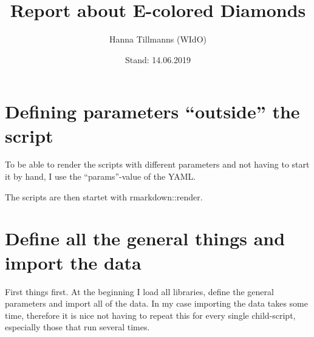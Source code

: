 \documentclass[12pt,]{article}
\title{\vspace{3in}Report about E-colored Diamonds}
\author{Hanna Tillmanns (WIdO)}
\date{Stand: 14.06.2019}
\newenvironment{Shaded}{\begin{snugshade}}{\end{snugshade}}
\newcommand{\KeywordTok}[1]{\textcolor[rgb]{0.13,0.29,0.53}{\textbf{#1}}}
\newcommand{\StringTok}[1]{\textcolor[rgb]{0.31,0.60,0.02}{#1}}
\newcommand{\CommentTok}[1]{\textcolor[rgb]{0.56,0.35,0.01}{\textit{#1}}}
\newcommand{\OperatorTok}[1]{\textcolor[rgb]{0.81,0.36,0.00}{\textbf{#1}}}
\newcommand{\NormalTok}[1]{#1}
\begin{document}
\maketitle

{
\setcounter{tocdepth}{2}
\tableofcontents
}
\section{\texorpdfstring{Defining parameters ``outside'' the
script}{Defining parameters outside the script}}\label{defining-parameters-outside-the-script}

To be able to render the scripts with different parameters and not
having to start it by hand, I use the ``params''-value of the YAML.

The scripts are then startet with rmarkdown::render.

\section{Define all the general things and import the
data}\label{define-all-the-general-things-and-import-the-data}

First things first. At the beginning I load all libraries, define the
general parameters and import all of the data. In my case importing the
data takes some time, therefore it is nice not having to repeat this for
every single child-script, especially those that run several times.

\begin{Shaded}
\end{Shaded}
\end{document}
